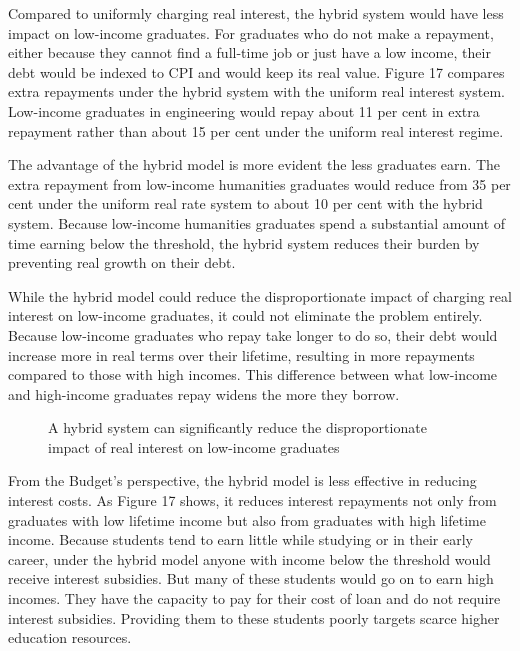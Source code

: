 \documentclass[embargoed]{grattan}
\begin{document}
Compared to uniformly charging real interest, the hybrid system would have less impact on low-income graduates. For graduates who do not make a repayment, either because they cannot find a full-time job or just have a low income, their debt would be indexed to CPI and would keep its real value. Figure 17 compares extra repayments under the hybrid system with the uniform real interest system. Low-income graduates in engineering would repay about 11 per cent in extra repayment rather than about 15 per cent under the uniform real interest regime.

The advantage of the hybrid model is more evident the less graduates earn. The extra repayment from low-income humanities graduates would reduce from 35 per cent under the uniform real rate system to about 10 per cent with the hybrid system. Because low-income humanities graduates spend a substantial amount of time earning below the threshold, the hybrid system reduces their burden by preventing real growth on their debt.

While the hybrid model could reduce the disproportionate impact of charging real interest on low-income graduates, it could not eliminate the problem entirely. Because low-income graduates who repay take longer to do so, their debt would increase more in real terms over their lifetime, resulting in more repayments compared to those with high incomes. This difference between what low-income and high-income graduates repay widens the more they borrow.

\begin{figure}
\caption{A hybrid system can significantly reduce the disproportionate impact of real interest on low-income graduates}\label{fig:fig17-a-hybrid-system-can-signif-reduce-disprop-impact-of-real-interest-low-income-grads}


\end{figure}

From the Budget's perspective, the hybrid model is less effective in reducing interest costs. As Figure 17 shows, it reduces interest repayments not only from graduates with low lifetime income but also from graduates with high lifetime income. Because students tend to earn little while studying or in their early career, under the hybrid model anyone with income below the threshold would receive interest subsidies. But many of these students would go on to earn high incomes. They have the capacity to pay for their cost of loan and do not require interest subsidies. Providing them to these students poorly targets scarce higher education resources.
\end{document}
